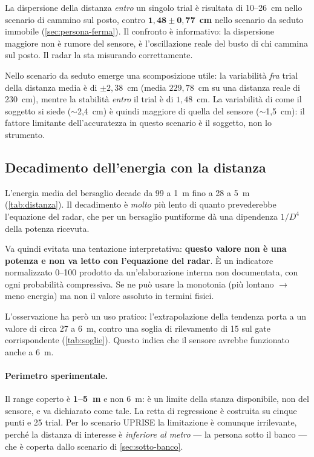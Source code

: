 La dispersione della distanza \emph{entro} un singolo trial è risultata di
10--26~cm nello scenario di cammino sul posto, contro
$\mathbf{1{,}48 \pm 0{,}77}$~\textbf{cm} nello scenario da seduto immobile
(\cref{sec:persona-ferma}). Il confronto è informativo: la dispersione maggiore non
è rumore del sensore, è l'oscillazione reale del busto di chi cammina sul posto. Il
radar la sta misurando correttamente.

Nello scenario da seduto emerge una scomposizione utile: la variabilità \emph{fra}
trial della distanza media è di $\pm 2{,}38$~cm (media $229{,}78$~cm su una distanza
reale di 230~cm), mentre la stabilità \emph{entro} il trial è di $1{,}48$~cm. La
variabilità di come il soggetto si siede ($\sim$2,4~cm) è quindi maggiore di quella
del sensore ($\sim$1,5~cm): il fattore limitante dell'accuratezza in questo scenario
è il soggetto, non lo strumento.

\subsection{Decadimento dell'energia con la distanza}
\label{sec:energia-distanza}

L'energia media del bersaglio decade da 99 a 1~m fino a 28 a 5~m
(\cref{tab:distanza}). Il decadimento è \emph{molto} più lento di quanto
prevederebbe l'equazione del radar, che per un bersaglio puntiforme dà una
dipendenza $1/D^4$ della potenza ricevuta.

Va quindi evitata una tentazione interpretativa: \textbf{questo valore non è una
potenza e non va letto con l'equazione del radar}. È un indicatore normalizzato
0--100 prodotto da un'elaborazione interna non documentata, con ogni probabilità
compressiva. Se ne può usare la monotonia (più lontano $\to$ meno energia) ma non il
valore assoluto in termini fisici.

L'osservazione ha però un uso pratico: l'extrapolazione della tendenza porta a un
valore di circa 27 a 6~m, contro una soglia di rilevamento di 15 sul gate
corrispondente (\cref{tab:soglie}). Questo indica che il sensore avrebbe funzionato
anche a 6~m.

\paragraph{Perimetro sperimentale.} Il range coperto è \textbf{1--5~m} e non 6~m: è
un limite della stanza disponibile, non del sensore, e va dichiarato come tale. La
retta di regressione è costruita su cinque punti e 25 trial. Per lo scenario UPRISE
la limitazione è comunque irrilevante, perché la distanza di interesse è
\emph{inferiore al metro} --- la persona sotto il banco --- che è coperta dallo
scenario di \cref{sec:sotto-banco}.

